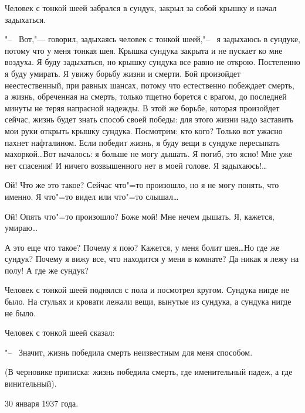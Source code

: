 Человек с тонкой шеей забрался в сундук, закрыл за собой крышку и начал задыхаться.

"--~ Вот,"--- говорил, задыхаясь человек с тонкой шеей,"--~ я задыхаюсь в сундуке, потому что у меня тонкая шея. Крышка сундука закрыта и не пускает ко мне воздуха. Я буду задыхаться, но крышку сундука все  равно  не открою. Постепенно я буду умирать. Я увижу борьбу жизни и смерти. Бой произойдет неестественный,  при равных шансах, потому что естественно  побеждает смерть, а жизнь, обреченная на смерть, только тщетно борется с врагом, до последней минуты не теряя напрасной надежды. В этой же  борьбе, которая произойдет сейчас, жизнь  будет  знать способ своей победы: для этого жизни надо заставить мои руки открыть крышку сундука. Посмотрим: кто кого? Только вот ужасно пахнет нафталином. Если победит жизнь, я буду вещи в  сундуке пересыпать  махоркой\dots Вот  началось: я больше не могу дышать. Я погиб, это ясно! Мне уже нет спасения! И ничего возвышенного нет в моей голове. Я задыхаюсь!\dots

Ой! Что же это такое? Сейчас что"=то произошло, но я не могу понять, что  именно.  Я что"=то видел или что"=то слышал\dots

Ой! Опять  что"=то произошло? Боже мой! Мне нечем дышать. Я, кажется, умираю\dots

А это еще что такое? Почему я пою? Кажется, у меня болит шея\dots Но где же сундук? Почему я вижу все, что находится у меня в комнате? Да никак я лежу на полу! А где же сундук?

Человек с тонкой шеей поднялся с пола и посмотрел кругом. Сундука нигде не было. На стульях и кровати лежали вещи, вынутые из сундука, а сундука нигде не было.

Человек с тонкой шеей сказал:

"--~ Значит, жизнь победила смерть неизвестным для меня способом.

(В черновике приписка: жизнь победила смерть, где именительный падеж, а где винительный).

\begin{flushright}30 января 1937 года.\end{flushright}